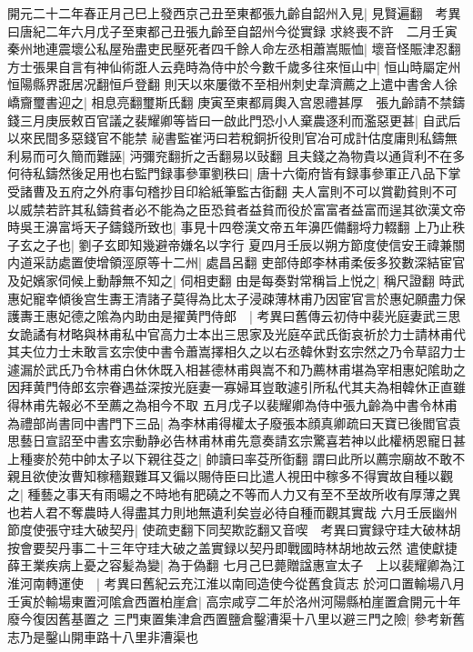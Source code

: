 開元二十二年春正月己巳上發西京己丑至東都張九齡自韶州入見|{
	見賢遍翻　考異曰唐紀二年六月戊子至東都己丑張九齡至自韶州今從實録}
求終喪不許　二月壬寅秦州地連震壞公私屋殆盡吏民壓死者四千餘人命左丞相蕭嵩賑恤|{
	壞音怪賑津忍翻}
方士張果自言有神仙術誑人云堯時為侍中於今數千歲多往來恒山中|{
	恒山時屬定州恒陽縣界誑居况翻恒戶登翻}
則天以來屢徵不至相州刺史韋濟薦之上遣中書舍人徐嶠齎璽書迎之|{
	相息亮翻璽斯氏翻}
庚寅至東都肩輿入宫恩禮甚厚　張九齡請不禁鑄錢三月庚辰敕百官議之裴耀卿等皆曰一啟此門恐小人棄農逐利而濫惡更甚|{
	自武后以來民間多惡錢官不能禁}
祕書監崔沔曰若稅銅折役則官冶可成計估度庸則私鑄無利易而可久簡而難誣|{
	沔彌兖翻折之舌翻易以䜴翻}
且夫錢之為物貴以通貨利不在多何待私鑄然後足用也右監門録事參軍劉秩曰|{
	唐十六衛府皆有録事參軍正八品下掌受諸曹及五府之外府事句稽抄目印給紙筆監古衘翻}
夫人富則不可以賞勸貧則不可以威禁若許其私鑄貧者必不能為之臣恐貧者益貧而役於富富者益富而逞其欲漢文帝時吳王濞富埓天子鑄錢所致也|{
	事見十四卷漢文帝五年濞匹備翻埒力輟翻}
上乃止秩子玄之子也|{
	劉子玄即知幾避帝嫌名以字行}
夏四月壬辰以朔方節度使信安王禕兼關内道采訪處置使增領涇原等十二州|{
	處昌呂翻}
吏部侍郎李林甫柔佞多狡數深結宦官及妃嬪家伺候上動靜無不知之|{
	伺相吏翻}
由是每奏對常稱旨上悦之|{
	稱尺證翻}
時武惠妃寵幸傾後宫生夀王清諸子莫得為比太子浸疎薄林甫乃因宦官言於惠妃願盡力保護夀王惠妃德之隂為内助由是擢黄門侍郎　|{
	考異曰舊傳云初侍中裴光庭妻武三思女詭譎有材略與林甫私中官高力士本出三思家及光庭卒武氏衘哀祈於力士請林甫代其夫位力士未敢言玄宗使中書令蕭嵩擇相久之以右丞韓休對玄宗然之乃令草詔力士遽漏於武氏乃令林甫白休休既入相甚德林甫與嵩不和乃薦林甫堪為宰相惠妃隂助之因拜黄門侍郎玄宗眷遇益深按光庭妻一寡婦耳豈敢遽引所私代其夫為相韓休正直雖得林甫先報必不至薦之為相今不取}
五月戊子以裴耀卿為侍中張九齡為中書令林甫為禮部尚書同中書門下三品|{
	為李林甫得權太子廢張本顔真卿疏曰天寶已後閻官袁思藝日宣詔至中書玄宗動静必告林甫林甫先意奏請玄宗驚喜若神以此權柄恩寵日甚}
上種麥於苑中帥太子以下親往芟之|{
	帥讀曰率芟所衘翻}
謂曰此所以薦宗廟故不敢不親且欲使汝曹知稼穡艱難耳又徧以賜侍臣曰比遣人視田中稼多不得實故自種以觀之|{
	種藝之事天有雨暘之不時地有肥磽之不等而人力又有至不至故所收有厚薄之異也若人君不奪農時人得盡其力則地無遺利矣豈必待自種而觀其實哉}
六月壬辰幽州節度使張守珪大破契丹|{
	使疏吏翻下同契欺訖翻又音喫　考異曰實録守珪大破林胡按會要契丹事二十三年守珪大破之盖實録以契丹即戰國時林胡地故云然}
遣使獻捷　薛王業疾病上憂之容髪為變|{
	為于偽翻}
七月己巳薨贈諡惠宣太子　上以裴耀卿為江淮河南轉運使　|{
	考異曰舊紀云充江淮以南囘造使今從舊食貨志}
於河口置輸場八月壬寅於輸場東置河隂倉西置柏崖倉|{
	高宗咸亨二年於洛州河陽縣柏崖置倉開元十年廢今復因舊基置之}
三門東置集津倉西置鹽倉鑿漕渠十八里以避三門之險|{
	參考新舊志乃是鑿山開車路十八里非漕渠也}

